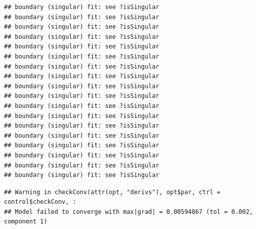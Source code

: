 \documentclass[
]{article}
\begin{document}
\begin{verbatim}
## boundary (singular) fit: see ?isSingular
## boundary (singular) fit: see ?isSingular
## boundary (singular) fit: see ?isSingular
## boundary (singular) fit: see ?isSingular
## boundary (singular) fit: see ?isSingular
## boundary (singular) fit: see ?isSingular
## boundary (singular) fit: see ?isSingular
## boundary (singular) fit: see ?isSingular
## boundary (singular) fit: see ?isSingular
## boundary (singular) fit: see ?isSingular
## boundary (singular) fit: see ?isSingular
## boundary (singular) fit: see ?isSingular
## boundary (singular) fit: see ?isSingular
## boundary (singular) fit: see ?isSingular
## boundary (singular) fit: see ?isSingular
## boundary (singular) fit: see ?isSingular
## boundary (singular) fit: see ?isSingular
## boundary (singular) fit: see ?isSingular
\end{verbatim}

\begin{verbatim}
## Warning in checkConv(attr(opt, "derivs"), opt$par, ctrl = control$checkConv, :
## Model failed to converge with max|grad| = 0.00594867 (tol = 0.002, component 1)
\end{verbatim}
\end{document}
